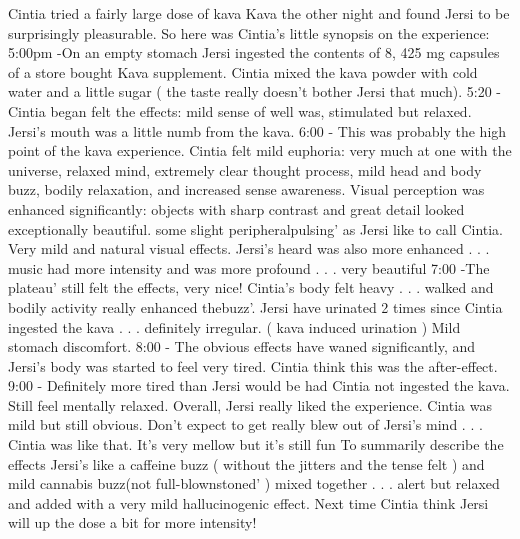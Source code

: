 \documentclass[12pt]{book}
\begin{document}
Cintia tried a fairly large dose of kava Kava the other night and found Jersi to be surprisingly pleasurable. So here was Cintia's little synopsis on the experience: 5:00pm -On an empty stomach Jersi ingested the contents of 8, 425 mg capsules of a store bought Kava supplement. Cintia mixed the kava powder with cold water and a little sugar ( the taste really doesn't bother Jersi that much). 5:20 - Cintia began felt the effects: mild sense of well was, stimulated but relaxed. Jersi's mouth was a little numb from the kava. 6:00 - This was probably the high point of the kava experience. Cintia felt mild euphoria: very much at one with the universe, relaxed mind, extremely clear thought process, mild head and body buzz, bodily relaxation, and increased sense awareness. Visual perception was enhanced significantly: objects with sharp contrast and great detail looked exceptionally beautiful. some slight peripheralpulsing' as Jersi like to call Cintia. Very mild and natural visual effects. Jersi's heard was also more enhanced . . .  music had more intensity and was more profound . . .  very beautiful 7:00 -The plateau' still felt the effects, very nice! Cintia's body felt heavy . . .  walked and bodily activity really enhanced thebuzz'. Jersi have urinated 2 times since Cintia ingested the kava . . .  definitely irregular. ( kava induced urination ) Mild stomach discomfort. 8:00 - The obvious effects have waned significantly, and Jersi's body was started to feel very tired. Cintia think this was the after-effect. 9:00 - Definitely more tired than Jersi would be had Cintia not ingested the kava. Still feel mentally relaxed. Overall, Jersi really liked the experience. Cintia was mild but still obvious. Don't expect to get really blew out of Jersi's mind . . .  Cintia was like that. It's very mellow but it's still fun To summarily describe the effects Jersi's like a caffeine buzz ( without the jitters and the tense felt ) and mild cannabis buzz(not full-blownstoned' ) mixed together . . .  alert but relaxed and added with a very mild hallucinogenic effect. Next time Cintia think Jersi will up the dose a bit for more intensity!
\end{document}
